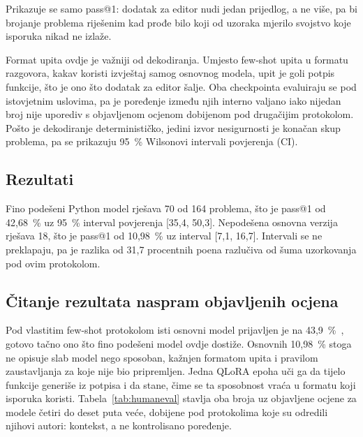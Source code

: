 \documentclass[10pt,conference,a4paper]{IEEEtran}
\begin{document}
Prikazuje se samo pass@1: dodatak za editor nudi jedan prijedlog, a ne više,
pa bi brojanje problema riješenim kad prođe bilo koji od uzoraka mjerilo
svojstvo koje isporuka nikad ne izlaže.

Format upita ovdje je važniji od dekodiranja. Umjesto few-shot upita u formatu
razgovora, kakav koristi izvještaj samog osnovnog modela, upit je goli potpis
funkcije, što je ono što dodatak za editor šalje. Oba checkpointa evaluiraju
se pod istovjetnim uslovima, pa je poređenje između njih interno valjano iako
nijedan broj nije uporediv s objavljenom ocjenom dobijenom pod drugačijim
protokolom. Pošto je dekodiranje determinističko, jedini izvor nesigurnosti
je konačan skup problema, pa se prikazuju 95~\% Wilsonovi intervali
povjerenja (CI).

\subsection{Rezultati}
Fino podešeni Python model rješava 70 od 164 problema, što je pass@1 od
42,68~\% uz 95~\% interval povjerenja [35,4, 50,3]. Nepodešena osnovna
verzija rješava 18, što je pass@1 od 10,98~\% uz interval [7,1, 16,7].
Intervali se ne preklapaju, pa je razlika od 31,7 procentnih poena
razlučiva od šuma uzorkovanja pod ovim protokolom.

\subsection{Čitanje rezultata naspram objavljenih ocjena}
Pod vlastitim few-shot protokolom isti osnovni model prijavljen je na
43,9~\%~\cite{hui2024}, gotovo tačno ono što fino podešeni model ovdje
dostiže. Osnovnih 10,98~\% stoga ne opisuje slab model nego sposoban, kažnjen
formatom upita i pravilom zaustavljanja za koje nije bio pripremljen. Jedna
QLoRA epoha uči ga da tijelo funkcije generiše iz potpisa i da stane, čime se
ta sposobnost vraća u formatu koji isporuka koristi. Tabela~\ref{tab:humaneval}
stavlja oba broja uz objavljene ocjene za modele četiri do deset puta veće,
dobijene pod protokolima koje su odredili njihovi autori: kontekst, a ne
kontrolisano poređenje.
\end{document}
